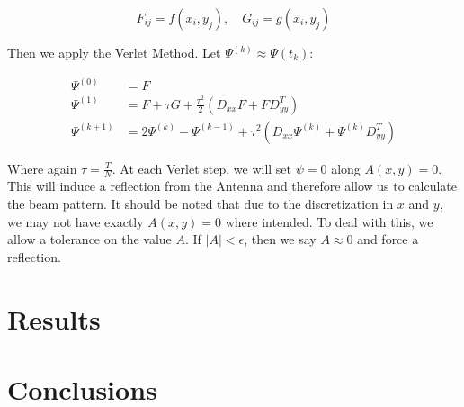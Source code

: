 \documentclass{article}
\begin{document}
$$F_{ij} = f(x_i,y_j), \quad G_{ij} = g(x_i,y_j)$$

Then we apply the Verlet Method.  Let $\Psi^{(k)} \approx \Psi(t_k)$:

\begin{equation}
    \label{eq:verlet-integration}
    \begin{split}
      \Psi^{(0)} & = F \\
      \Psi^{(1)} & = F + \tau G +
      \frac{\tau^2}{2} \left(D_{xx} F + F D_{yy}^T\right) \\
      \Psi^{(k+1)} & = 2\Psi^{(k)} - \Psi^{(k-1)} +
      \tau^2 \left(D_{xx} \Psi^{(k)} + \Psi^{(k)}D_{yy}^T \right)
    \end{split}
\end{equation}

Where again $\tau = \frac{T}{N}$.  At each Verlet step, we will set
$\psi = 0$ along $A(x,y) = 0$.  This will induce a reflection from the Antenna
and therefore allow us to calculate the beam pattern.  It should be noted that
due to the discretization in $x$ and $y$, we may not have exactly $A(x,y) = 0$
where intended.  To deal with this, we allow a tolerance on the value $A$.
If $|A| < \epsilon$, then we say $A \approx 0$ and force a reflection.


\section{Results}

\section{Conclusions}
\end{document}
